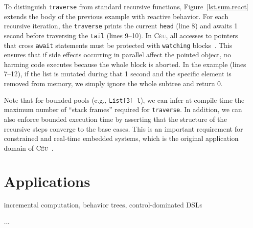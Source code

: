 \documentclass{acm_proc_article-sp}
\newcommand{\CEU}{\textsc{C\'{e}u}\xspace}
\newcommand{\code}[1] {{\small{\texttt{#1}}}}
\begin{document}
To distinguish \code{traverse} from standard recursive functions, 
Figure~\ref{lst.sum.react} extends the body of the previous example with 
reactive behavior.
For each recursive iteration, the \code{traverse} prints the current 
\code{head} (line 8) and awaits 1 second before traversing the \code{tail} 
(lines 9--10).
In \CEU, all accesses to pointers that cross \code{await} statements must be 
protected with \code{watching} blocks~\cite{ceu.mod15}.
This ensures that if side effects occurring in parallel affect the pointed 
object, no harming code executes because the whole block is aborted.
In the example (lines 7--12), if the list is mutated during that 1 second and 
the specific element is removed from memory, we simply ignore the whole subtree 
and return 0.

Note that for bounded pools (e.g., \code{List[3] l}), we can infer at compile 
time the maximum number of ``stack frames'' required for \code{traverse}.
In addition, we can also enforce bounded execution time by asserting that the 
structure of the recursive steps converge to the base cases.
This is an important requirement for constrained and real-time embedded 
systems, which is the original application domain of \CEU~\cite{ceu.sensys13}.

\begin{comment}
\begin{figure}%
\begin{lstlisting}[numbers=left,xleftmargin=3em]
class FoldL with
   pool List[]&   l;
   pool Action[]& actions;
   var  int&     acc;
do
   traverse e in l do
      if e:CONS then
         var Action*? a =
            spawn Action in actions with
               this.e    = e;
               action.acc = acc;
            end
         await *a;
      end
   end
end
\end{lstlisting}
\caption{
Calculating the \emph{sum} of a list.
\label{lst.sum}
}
\end{figure}
\end{comment}

\section{Applications}

incremental computation, behavior trees, control-dominated DSLs

...
\end{document}
